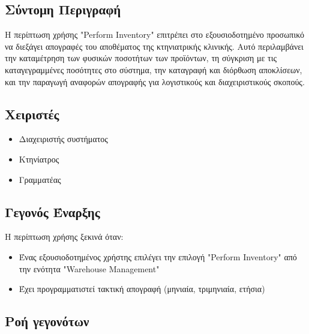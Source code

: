 \documentclass[12pt,a4paper,twoside]{book}
\begin{document}
\subsection{Σύντομη Περιγραφή}
Η περίπτωση χρήσης "Perform Inventory" επιτρέπει στο εξουσιοδοτημένο προσωπικό να διεξάγει απογραφές του αποθέματος της κτηνιατρικής κλινικής. Αυτό περιλαμβάνει την καταμέτρηση των φυσικών ποσοτήτων των προϊόντων, τη σύγκριση με τις καταγεγραμμένες ποσότητες στο σύστημα, την καταγραφή και διόρθωση αποκλίσεων, και την παραγωγή αναφορών απογραφής για λογιστικούς και διαχειριστικούς σκοπούς. %

\subsection{Χειριστές}
\begin{itemize}
  \item Διαχειριστής συστήματος
  \item Κτηνίατρος
  \item Γραμματέας
\end{itemize}

\subsection{Γεγονός Έναρξης}
Η περίπτωση χρήσης ξεκινά όταν:
\begin{itemize}
  \item Ένας εξουσιοδοτημένος χρήστης επιλέγει την επιλογή "Perform Inventory" από την ενότητα "Warehouse Management" %
  \item Έχει προγραμματιστεί τακτική απογραφή (μηνιαία, τριμηνιαία, ετήσια)
\end{itemize}

\subsection{Ροή γεγονότων}
\end{document}
